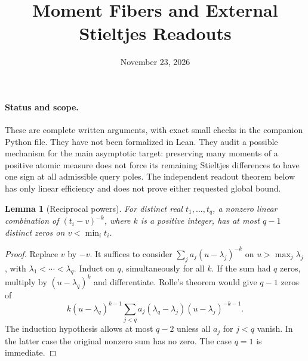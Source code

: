 \documentclass[11pt]{article}
\title{Moment Fibers and External Stieltjes Readouts}
\author{}
\date{November 23, 2026}
\newtheorem{lemma}[theorem]{Lemma}
\begin{document}
\maketitle

\paragraph{Status and scope.}
These are complete written arguments, with exact small checks in the
companion Python file. They have not been formalized in Lean. They audit
a possible mechanism for the main asymptotic target: preserving many
moments of a positive atomic measure does not force its remaining
Stieltjes differences to have one sign at all admissible query poles.
The independent readout theorem below has only linear efficiency and
does not prove either requested global bound.

\begin{lemma}[Reciprocal powers]
For distinct real $t_1,\ldots,t_q$, a nonzero linear combination of
$(t_i-v)^{-k}$, where $k$ is a positive integer, has at most $q-1$
distinct zeros on $v<\min_i t_i$.
\end{lemma}
\begin{proof}
Replace $v$ by $-v$. It suffices to consider
$\sum_j a_j(u-\lambda_j)^{-k}$ on $u>\max_j\lambda_j$,
with $\lambda_1<\cdots<\lambda_q$.
Induct on $q$, simultaneously for all $k$. If the sum had $q$ zeros,
multiply by $(u-\lambda_q)^k$ and differentiate. Rolle's theorem
would give $q-1$ zeros of
\[
 k(u-\lambda_q)^{k-1}
 \sum_{j<q} a_j(\lambda_q-\lambda_j)(u-\lambda_j)^{-k-1}.
\]
The induction hypothesis allows at most $q-2$ unless all $a_j$ for
$j<q$ vanish. In the latter case the original nonzero sum has no
zero. The case $q=1$ is immediate.
\end{proof}
\end{document}
